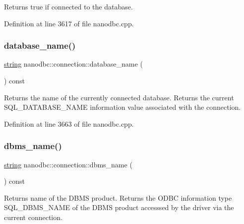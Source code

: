 Returns true if connected to the database. 



Definition at line 3617 of file nanodbc.\+cpp.

\mbox{\label{classnanodbc_1_1connection_af6cc1d8f8eaa9cd2ac9f215020f75dec}} 
\subsubsection{\texorpdfstring{database\_name()}{database\_name()}}
{\footnotesize\ttfamily \mbox{\hyperlink{namespacenanodbc_abfc0ece56278e590911ec8352774c212}{string}} nanodbc\+::connection\+::database\+\_\+name (\begin{DoxyParamCaption}{ }\end{DoxyParamCaption}) const}



Returns the name of the currently connected database. Returns the current S\+Q\+L\+\_\+\+D\+A\+T\+A\+B\+A\+S\+E\+\_\+\+N\+A\+ME information value associated with the connection. 



Definition at line 3663 of file nanodbc.\+cpp.

\mbox{\label{classnanodbc_1_1connection_a39d2e978322f4f8c24ece6641169fd30}} 
\subsubsection{\texorpdfstring{dbms\_name()}{dbms\_name()}}
{\footnotesize\ttfamily \mbox{\hyperlink{namespacenanodbc_abfc0ece56278e590911ec8352774c212}{string}} nanodbc\+::connection\+::dbms\+\_\+name (\begin{DoxyParamCaption}{ }\end{DoxyParamCaption}) const}



Returns name of the D\+B\+MS product. Returns the O\+D\+BC information type S\+Q\+L\+\_\+\+D\+B\+M\+S\+\_\+\+N\+A\+ME of the D\+B\+MS product accesssed by the driver via the current connection. 



